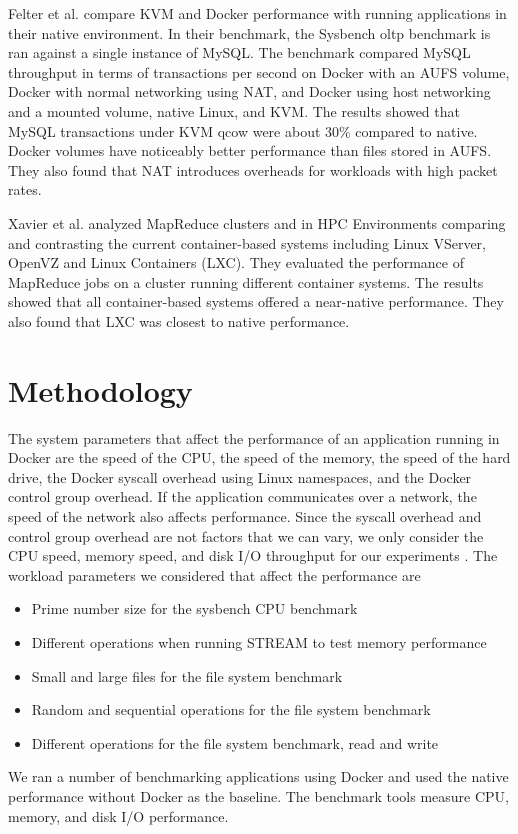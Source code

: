 \documentclass[11pt]{article}
\begin{document}
Felter et al. \cite{felter} compare KVM and Docker performance with running applications in their native environment. In their benchmark, the Sysbench oltp benchmark is ran against a single instance of MySQL. The benchmark compared MySQL throughput in terms of transactions per second on Docker with an AUFS volume, Docker with normal networking using NAT, and Docker using host networking and a mounted volume, native Linux, and KVM. The results showed that MySQL transactions under KVM qcow were about 30\% compared to native. Docker volumes have noticeably better performance than files stored in AUFS. They also found that NAT introduces overheads for workloads with high packet rates. 

Xavier et al. \cite{xavier} analyzed MapReduce clusters and in HPC Environments comparing and contrasting the current container-based systems including Linux VServer, OpenVZ and Linux Containers (LXC). They evaluated the performance of MapReduce jobs on a cluster running different container systems. The results showed that all container-based systems offered a near-native performance. They also found that LXC was closest to native performance. 

\section{Methodology}
The system parameters that affect the performance of an application running in Docker are the speed of the CPU, the speed of the memory, the speed of the hard drive, the Docker syscall overhead using Linux namespaces, and the Docker control group overhead. If the application communicates over a network, the speed of the network also affects performance. Since the syscall overhead and control group overhead are not factors that we can vary, we only consider the CPU speed, memory speed, and disk I/O throughput for our experiments \cite{bukh}. The workload parameters we considered that affect the performance are 
\begin{itemize}
\item Prime number size for the sysbench CPU benchmark
\item Different operations when running STREAM to test memory performance
\item Small and large files for the file system benchmark
\item Random and sequential operations for the file system benchmark
\item Different operations for the file system benchmark, read and write
\end{itemize}
We ran a number of benchmarking applications using Docker and used the native performance without Docker as the baseline. The benchmark tools measure CPU, memory, and disk I/O performance. 
\end{document}
